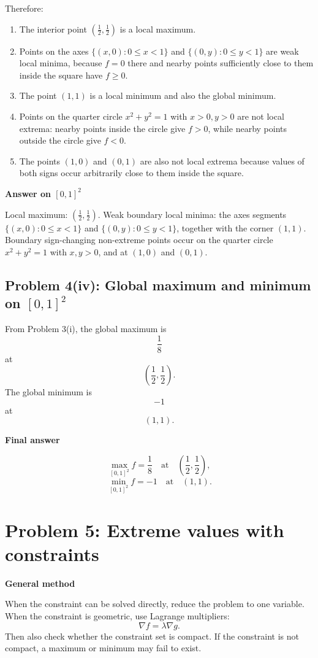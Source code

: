 \documentclass[11pt]{article}
\newenvironment{methodbox}[1]{\par\medskip\noindent\textcolor{lineblue}{\textbf{#1}}\par\smallskip}{\par\medskip}
\newenvironment{answerbox}[1]{\par\medskip\noindent\textcolor{linegreen}{\textbf{#1}}\par\smallskip}{\par\medskip}
\newcommand{\grad}{\nabla}
\begin{document}
Therefore:
\begin{enumerate}
\item The interior point $\left(\frac12,\frac12\right)$ is a local maximum.
\item Points on the axes $\{(x,0):0\le x<1\}$ and $\{(0,y):0\le y<1\}$ are weak local minima, because $f=0$ there and nearby points sufficiently close to them inside the square have $f\ge0$.
\item The point $(1,1)$ is a local minimum and also the global minimum.
\item Points on the quarter circle $x^2+y^2=1$ with $x>0,y>0$ are not local extrema: nearby points inside the circle give $f>0$, while nearby points outside the circle give $f<0$.
\item The points $(1,0)$ and $(0,1)$ are also not local extrema because values of both signs occur arbitrarily close to them inside the square.
\end{enumerate}

\begin{answerbox}{Answer on $[0,1]^2$}
Local maximum: $\left(\frac12,\frac12\right)$.  Weak boundary local minima: the axes segments $\{(x,0):0\le x<1\}$ and $\{(0,y):0\le y<1\}$, together with the corner $(1,1)$.  Boundary sign-changing non-extreme points occur on the quarter circle $x^2+y^2=1$ with $x,y>0$, and at $(1,0)$ and $(0,1)$.
\end{answerbox}

\subsection*{Problem 4(iv): Global maximum and minimum on $[0,1]^2$}
From Problem 3(i), the global maximum is
\[
\frac18
\]
at
\[
\left(\frac12,\frac12\right).
\]
The global minimum is
\[
-1
\]
at
\[
(1,1).
\]

\begin{answerbox}{Final answer}
\[
\max_{[0,1]^2} f=\frac18
\quad\text{at}\quad \left(\frac12,\frac12\right),
\]
\[
\min_{[0,1]^2} f=-1
\quad\text{at}\quad (1,1).
\]
\end{answerbox}

\newpage
\section{Problem 5: Extreme values with constraints}

\begin{methodbox}{General method}
When the constraint can be solved directly, reduce the problem to one variable. When the constraint is geometric, use Lagrange multipliers:
\[
\grad f=\lambda \grad g.
\]
Then also check whether the constraint set is compact. If the constraint is not compact, a maximum or minimum may fail to exist.
\end{methodbox}
\end{document}
